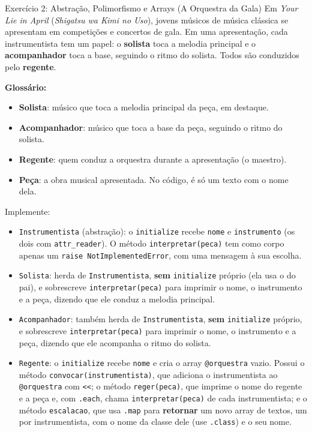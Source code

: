 \begin{exercicio}{Exercício 2: Abstração, Polimorfismo e Arrays (A Orquestra da Gala)}
Em \textit{Your Lie in April} (\textit{Shigatsu wa Kimi no Uso}), jovens músicos de música
clássica se apresentam em competições e concertos de gala. Em uma apresentação, cada
instrumentista tem um papel: o \textbf{solista} toca a melodia principal e o
\textbf{acompanhador} toca a base, seguindo o ritmo do solista. Todos são conduzidos pelo
\textbf{regente}.

\textbf{Glossário:}
\begin{itemize}
    \item \textbf{Solista}: músico que toca a melodia principal da peça, em destaque.
    \item \textbf{Acompanhador}: músico que toca a base da peça, seguindo o ritmo do solista.
    \item \textbf{Regente}: quem conduz a orquestra durante a apresentação (o maestro).
    \item \textbf{Peça}: a obra musical apresentada. No código, é só um texto com o nome dela.
\end{itemize}

Implemente:

\begin{itemize}
    \item \texttt{Instrumentista} (abstração): o \texttt{initialize} recebe \texttt{nome} e
    \texttt{instrumento} (os dois com \texttt{attr\_reader}). O método
    \texttt{interpretar(peca)} tem como corpo apenas um \texttt{raise NotImplementedError}, com
    uma mensagem à sua escolha.

    \item \texttt{Solista}: herda de \texttt{Instrumentista}, \textbf{sem} \texttt{initialize}
    próprio (ela usa o do pai), e sobrescreve \texttt{interpretar(peca)} para imprimir o nome, o
    instrumento e a peça, dizendo que ele conduz a melodia principal.

    \item \texttt{Acompanhador}: também herda de \texttt{Instrumentista}, \textbf{sem}
    \texttt{initialize} próprio, e sobrescreve \texttt{interpretar(peca)} para imprimir o nome,
    o instrumento e a peça, dizendo que ele acompanha o ritmo do solista.

    \item \texttt{Regente}: o \texttt{initialize} recebe \texttt{nome} e cria o array
    \texttt{@orquestra} vazio. Possui o método \texttt{convocar(instrumentista)}, que adiciona o
    instrumentista ao \texttt{@orquestra} com \texttt{<{}<}; o método \texttt{reger(peca)}, que
    imprime o nome do regente e a peça e, com \texttt{.each}, chama \texttt{interpretar(peca)}
    de cada instrumentista; e o método \texttt{escalacao}, que usa \texttt{.map} para
    \textbf{retornar} um novo array de textos, um por instrumentista, com o nome da classe dele
    (use \texttt{.class}) e o seu nome.
\end{itemize}


\end{exercicio}

